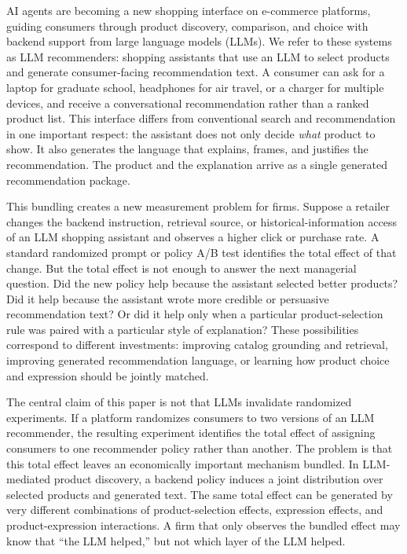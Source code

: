 \documentclass[11pt]{article}
\begin{document}
AI agents are becoming a new shopping interface on e-commerce platforms, guiding consumers through product discovery, comparison, and choice with backend support from large language models (LLMs). We refer to these systems as LLM recommenders: shopping assistants that use an LLM to select products and generate consumer-facing recommendation text. A consumer can ask for a laptop for graduate school, headphones for air travel, or a charger for multiple devices, and receive a conversational recommendation rather than a ranked product list. This interface differs from conventional search and recommendation in one important respect: the assistant does not only decide \emph{what} product to show. It also generates the language that explains, frames, and justifies the recommendation. The product and the explanation arrive as a single generated recommendation package.

This bundling creates a new measurement problem for firms. Suppose a retailer changes the backend instruction, retrieval source, or historical-information access of an LLM shopping assistant and observes a higher click or purchase rate. A standard randomized prompt or policy A/B test identifies the total effect of that change. But the total effect is not enough to answer the next managerial question. Did the new policy help because the assistant selected better products? Did it help because the assistant wrote more credible or persuasive recommendation text? Or did it help only when a particular product-selection rule was paired with a particular style of explanation? These possibilities correspond to different investments: improving catalog grounding and retrieval, improving generated recommendation language, or learning how product choice and expression should be jointly matched.

The central claim of this paper is not that LLMs invalidate randomized experiments. If a platform randomizes consumers to two versions of an LLM recommender, the resulting experiment identifies the total effect of assigning consumers to one recommender policy rather than another. The problem is that this total effect leaves an economically important mechanism bundled. In LLM-mediated product discovery, a backend policy induces a joint distribution over selected products and generated text. The same total effect can be generated by very different combinations of product-selection effects, expression effects, and product-expression interactions. A firm that only observes the bundled effect may know that ``the LLM helped,'' but not which layer of the LLM helped.
\end{document}
